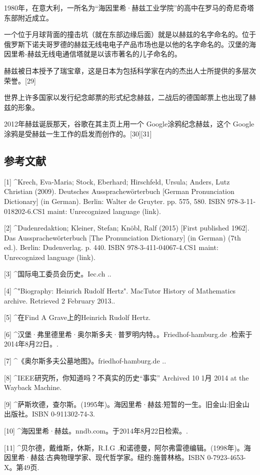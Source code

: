 1980年，在意大利，一所名为“海因里希·赫兹工业学院”的高中在罗马的奇尼奇塔东部附近成立。

一个位于月球背面的撞击坑（就在东部边缘后面）就是以赫兹的名字命名的。位于俄罗斯下诺夫哥罗德的赫兹无线电电子产品市场也是以他的名字命名的。汉堡的海因里希-赫兹无线电通信塔就是以该市著名的儿子命名的。

赫兹被日本授予了瑞宝章，这是日本为包括科学家在内的杰出人士所提供的多层次荣誉。[29]

世界上许多国家以发行纪念邮票的形式纪念赫兹，二战后的德国邮票上也出现了赫兹的形象。

2012年赫兹诞辰那天，谷歌在其主页上用一个 Google涂鸦纪念赫兹，这个 Google涂鸦是受赫兹一生工作的启发而创作的。[30][31]

\subsection{参考文献}
[1]
^Krech, Eva-Maria; Stock, Eberhard; Hirschfeld, Ursula; Anders, Lutz Christian (2009). Deutsches Aussprachewörterbuch [German Pronunciation Dictionary] (in German). Berlin: Walter de Gruyter. pp. 575, 580. ISBN 978-3-11-018202-6.CS1 maint: Unrecognized language (link).

[2]
^Dudenredaktion; Kleiner, Stefan; Knöbl, Ralf (2015) [First published 1962]. Das Aussprachewörterbuch [The Pronunciation Dictionary] (in German) (7th ed.). Berlin: Dudenverlag. p. 440. ISBN 978-3-411-04067-4.CS1 maint: Unrecognized language (link).

[3]
^国际电工委员会历史。Iec.ch ..

[4]
^"Biography: Heinrich Rudolf Hertz". MacTutor History of Mathematics archive. Retrieved 2 February 2013..

[5]
^在Find A Grave上的Heinrich Rudolf Hertz.

[6]
^汉堡·弗里德里希·奥尔斯多夫·普罗明内特。。Friedhof-hamburg.de .检索于2014年8月22日。.

[7]
^《奥尔斯多夫公墓地图》。friedhof-hamburg.de ..

[8]
^IEEE研究所，你知道吗？不真实的历史“事实” Archived 10 1月 2014 at the Wayback Machine.

[9]
^萨斯坎德，查尔斯。(1995年)。海因里希·赫兹:短暂的一生。旧金山:旧金山出版社。ISBN 0-911302-74-3.

[10]
^海因里希·赫兹。nndb.com。于2014年8月22日检索。.

[11]
^贝尔德，戴维斯，休斯，R.I.G .和诺德曼，阿尔弗雷德编辑。(1998年)。海因里希·赫兹:古典物理学家、现代哲学家。纽约:施普林格。ISBN 0-7923-4653-X。第49页.

